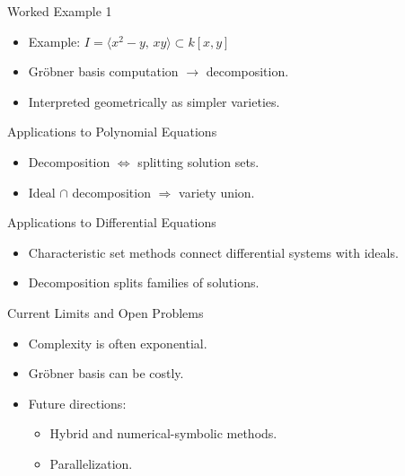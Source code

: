 \documentclass[11pt]{beamer}
\begin{document}
\begin{frame}{Worked Example 1}
\begin{itemize}
  \item Example: $I = \langle x^2-y, \, xy \rangle \subset k[x,y]$
  \item Gröbner basis computation $\rightarrow$ decomposition.
  \item Interpreted geometrically as simpler varieties.
\end{itemize}
\centering
{}
\end{frame}

\begin{frame}{Applications to Polynomial Equations}
\begin{itemize}
  \item Decomposition $\Leftrightarrow$ splitting solution sets.
  \item Ideal $\cap$ decomposition $\Rightarrow$ variety union.
\end{itemize}
\centering
{}
\end{frame}

\begin{frame}{Applications to Differential Equations}
\begin{itemize}
  \item Characteristic set methods connect differential systems with ideals.
  \item Decomposition splits families of solutions.
\end{itemize}
\end{frame}

\begin{frame}{Current Limits and Open Problems}
\begin{itemize}
  \item Complexity is often exponential.
  \item Gröbner basis can be costly.
  \item Future directions:
    \begin{itemize}
      \item Hybrid and numerical-symbolic methods.
      \item Parallelization.
    \end{itemize}
\end{itemize}
\end{frame}
\end{document}
